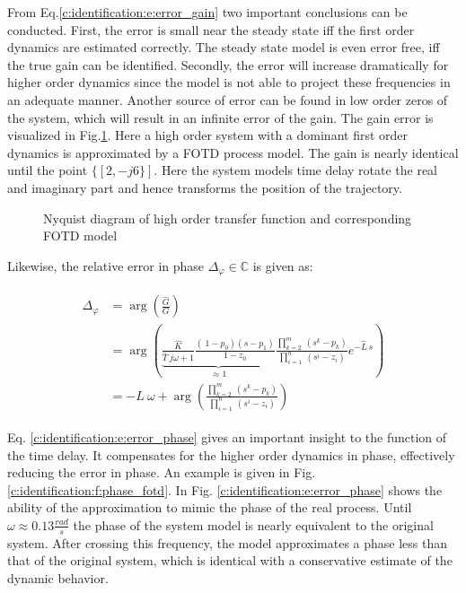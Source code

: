 From Eq.\ref{c:identification:e:error_gain} two important conclusions can be conducted. First, the error is small near the steady state iff the first order dynamics are estimated correctly. The steady state model is even error free, iff the true gain can be identified. Secondly, the error will increase dramatically for higher order dynamics since the model is not able to project these frequencies in an adequate manner. Another source of error can be found in low order zeros of the system, which will result in an infinite error of the gain. The gain error is visualized in Fig.\ref{c:identification:f:nyquist_fotd}. Here a high order system with a dominant first order dynamics is approximated by a FOTD process model. The gain is nearly identical until the point $\lbrace[2,-j6\rbrace]$. Here the system models time delay rotate the real and imaginary part and hence transforms the position of the trajectory. \\

\begin{figure}[H]\centering
  
  \caption{Nyquist diagram of high order transfer function and corresponding FOTD model}
  \label{c:identification:f:nyquist_fotd}
\end{figure}

Likewise, the relative error in phase $\Delta_\varphi \in \mathbb{C}$ is given as:

\begin{align}
\begin{split}
\Delta_\varphi &= \arg\left(\frac{\hat{G}}{G}\right) \\
&= \arg\left(\underbrace{\frac{\hat{K}}{\hat{T}~j\omega+1} \frac{\left(\ 1-p_0 \right)\left( s- p_1 \right)}{1-z_0}}_{\approx 1} \frac{\prod_{k=2}^m~(s^k-p_k)}{\prod_{i=1}^n~(s^i-z_i)}e^{-\hat{L}~s} \right)\\
&= -L~\omega + \arg\left(\frac{\prod_{k=2}^m~(s^k-p_k)}{\prod_{i=1}^n~(s^i-z_i)}\right)
\end{split}
\label{c:identification:e:error_phase}
\end{align}

Eq. \ref{c:identification:e:error_phase} gives an important insight to the function of the time delay. It compensates for the higher order dynamics in phase, effectively reducing the error in phase. An example is given in Fig.\ref{c:identification:f:phase_fotd}. In Fig. \ref{c:identification:e:error_phase} shows the ability of the approximation to mimic the phase of the real process. Until $\omega \approx 0.13 \frac{rad}{s}$ the phase of the system model is nearly equivalent to the original system. After crossing this frequency, the model approximates a phase less than that of the original system, which is identical with a conservative estimate of the dynamic behavior.


